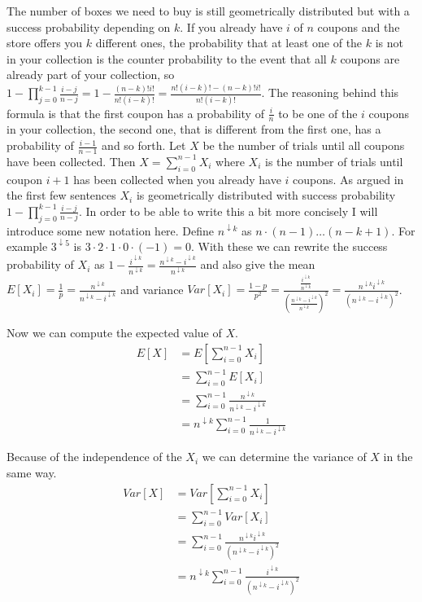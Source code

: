 \documentclass[10pt,a4paper]{article}
\begin{document}
The number of boxes we need to buy is still geometrically distributed but with a success probability depending on $k$.
If you already have $i$ of $n$ coupons and the store offers you $k$ different ones, the probability that at least one of the $k$ is not in your collection is the counter probability to the event that all $k$ coupons are already part of your collection, so $1 - \prod_{j = 0}^{k - 1} \frac{i - j}{n - j} = 1 - \frac{(n - k)!i!}{n!(i - k)!} = \frac{n!(i - k)! - (n - k)!i!}{n!(i - k)!}$.
The reasoning behind this formula is that the first coupon has a probability of $\frac{i}{n}$ to be one of the $i$ coupons in your collection, the second one, that is different from the first one, has a probability of $\frac{i - 1}{n - 1}$ and so forth.
Let $X$ be the number of trials until all coupons have been collected.
Then $X = \sum_{i = 0}^{n - 1} X_{i}$ where $X_{i}$ is the number of trials until coupon $i + 1$ has been collected when you already have $i$ coupons.
As argued in the first few sentences $X_{i}$ is geometrically distributed with success probability $1 - \prod_{j = 0}^{k - 1} \frac{i - j}{n - j}$.
In order to be able to write this a bit more concisely I will introduce some new notation here.
Define $n^{\downarrow k}$ as $n \cdot (n - 1) \dots (n - k + 1)$.
For example $3^{\downarrow 5}$ is $3 \cdot 2 \cdot 1 \cdot 0 \cdot (-1) = 0$.
With these we can rewrite the success probability of $X_{i}$ as $1 - \frac{i^{\downarrow k}}{n^{\downarrow k}} = \frac{n^{\downarrow k} - i^{\downarrow k}}{n^{\downarrow k}}$ and also give the mean $E[X_{i}] = \frac{1}{p} = \frac{n^{\downarrow k}}{n^{\downarrow k} - i^{\downarrow k}}$ and variance $Var[X_{i}] = \frac{1 - p}{p^{2}} = \frac{\frac{i^{\downarrow k}}{n^{\downarrow k}}}{\left( \frac{n^{\downarrow k} - i^{\downarrow k}}{n^{\downarrow k}} \right)^{2}} = \frac{n^{\downarrow k}i^{\downarrow k}}{\left( n^{\downarrow k} - i^{\downarrow k} \right)^{2}}$.

Now we can compute the expected value of $X$.
\begin{align*}
  E[X] & = E\left[ \sum_{i = 0}^{n - 1} X_{i} \right]\\
       & = \sum_{i = 0}^{n - 1} E\left[ X_{i} \right]\\
       & = \sum_{i = 0}^{n - 1} \frac{n^{\downarrow k}}{n^{\downarrow k} - i^{\downarrow k}}\\
       & = n^{\downarrow k} \sum_{i = 0}^{n - 1} \frac{1}{n^{\downarrow k} - i^{\downarrow k}}
\end{align*}

Because of the independence of the $X_{i}$ we can determine the variance of $X$ in the same way.
\begin{align*}
  Var[X] & = Var\left[ \sum_{i = 0}^{n - 1} X_{i} \right]\\
         & = \sum_{i = 0}^{n - 1} Var\left[ X_{i} \right]\\
         & = \sum_{i = 0}^{n - 1} \frac{n^{\downarrow k}i^{\downarrow k}}{\left( n^{\downarrow k} - i^{\downarrow k} \right)^{2}}\\
         & = n^{\downarrow k} \sum_{i = 0}^{n - 1} \frac{i^{\downarrow k}}{\left( n^{\downarrow k} - i^{\downarrow k} \right)^{2}}
\end{align*}
\end{document}
